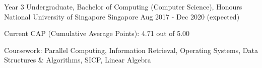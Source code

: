 

\begin{cventries}

  \cventry
  {Year 3 Undergraduate, Bachelor of Computing (Computer Science), Honours} %
  {National University of Singapore} %
  {Singapore} %
  {Aug 2017 - Dec 2020 (expected)} %
  {
    \begin{cvitems} %
      \item {Current CAP (Cumulative Average Points): 4.71 out of 5.00}
      \item {Coursework: Parallel Computing, Information Retrieval, Operating Systems, Data Structures \& Algorithms, SICP, Linear Algebra}
    \end{cvitems}
  }




\end{cventries}
